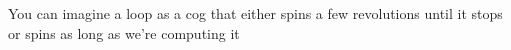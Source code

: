 \documentclass[preview]{standalone}
\begin{document}
\begin{center}
You can imagine a loop as a cog that either spins a few revolutions until it stops or spins as long as we're computing it
\end{center}
\end{document}
